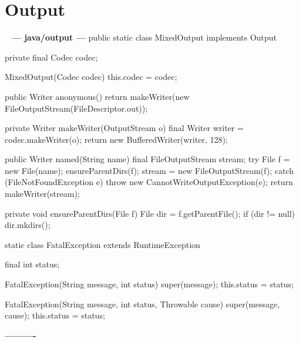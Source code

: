 \documentclass{book}
\newenvironment{chunk}[1]{%
{\ }\newline\noindent%
\hbox{\hskip 2.0cm}{\bf --- #1 ---}%
\verbatim}%                               say exactly what we see
{\endverbatim%
\par{}%
\noindent{}%
\hbox{\hskip 2.0cm}{\bf ----------}%
\par%
\normalsize\noindent}%
\begin{document}
\section{Output}
\begin{chunk}{java/output}
public static class MixedOutput implements Output {
    private final Codec codec;

    MixedOutput(Codec codec) {
        this.codec = codec;
    }

    public Writer anonymous() {
        return makeWriter(new FileOutputStream(FileDescriptor.out));
    }

    private Writer makeWriter(OutputStream o) {
        final Writer writer = codec.makeWriter(o);
        return new BufferedWriter(writer, 128);
    }

    public Writer named(String name) {
        final FileOutputStream stream;
        try {
            File f = new File(name);
            ensureParentDirs(f);
            stream = new FileOutputStream(f);
        } catch (FileNotFoundException e) {
            throw new CannotWriteOutputException(e);
        }
        return makeWriter(stream);
    }

    private void ensureParentDirs(File f) {
        File dir = f.getParentFile();
        if (dir != null) {
            dir.mkdirs();
        }
    }
}

static class FatalException extends RuntimeException {
    final int status;

    FatalException(String message, int status) {
        super(message);
        this.status = status;
    }

    FatalException(String message, int status, Throwable cause) {
        super(message, cause);
        this.status = status;
    }
}
\end{chunk}
\end{document}
